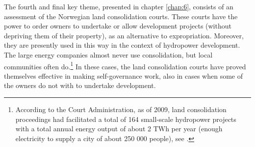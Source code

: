 The fourth and final key theme, presented in chapter \ref{chap:6}, consists of an assessment of the Norwegian land consolidation courts. These courts have the power to order owners to undertake or allow development projects (without depriving them of their property), as an alternative to expropriation. Moreover, they are presently used in this way in the context of hydropower development. The large energy companies almost never use consolidation, but local communities often do.\footnote{According to the Court Administration, as of 2009, land consolidation proceedings had facilitated a total of 164 small-scale hydropower projects with a total annual energy output of about 2 TWh per year (enough electricity to supply a city of about 250 000 people), see \cite{dom09}.} In these cases, the land consolidation courts have proved themselves effective in making self-governance work, also in cases when some of the owners do not with to undertake development.

